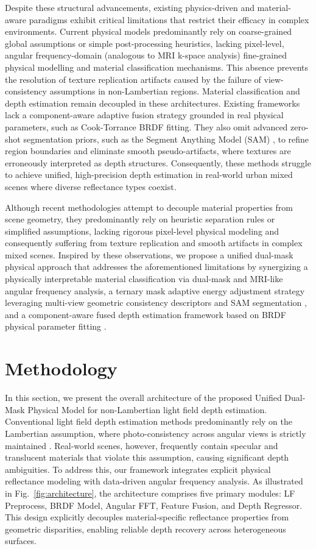 \documentclass[lettersize,journal]{IEEEtran}
\begin{document}
Despite these structural advancements, existing physics-driven and material-aware paradigms exhibit critical limitations that restrict their efficacy in complex environments. Current physical models predominantly rely on coarse-grained global assumptions or simple post-processing heuristics, lacking pixel-level, angular frequency-domain (analogous to MRI k-space analysis) fine-grained physical modelling and material classification mechanisms. This absence prevents the resolution of texture replication artifacts caused by the failure of view-consistency assumptions in non-Lambertian regions. Material classification and depth estimation remain decoupled in these architectures. Existing frameworks lack a component-aware adaptive fusion strategy grounded in real physical parameters, such as Cook-Torrance BRDF fitting. They also omit advanced zero-shot segmentation priors, such as the Segment Anything Model (SAM) \cite{kirillov2023}, to refine region boundaries and eliminate smooth pseudo-artifacts, where textures are erroneously interpreted as depth structures. Consequently, these methods struggle to achieve unified, high-precision depth estimation in real-world urban mixed scenes where diverse reflectance types coexist.

Although recent methodologies \cite{li2021, zhang2023} attempt to decouple material properties from scene geometry, they predominantly rely on heuristic separation rules or simplified assumptions, lacking rigorous pixel-level physical modeling and consequently suffering from texture replication and smooth artifacts in complex mixed scenes. Inspired by these observations, we propose a unified dual-mask physical approach that addresses the aforementioned limitations by synergizing a physically interpretable material classification via dual-mask and MRI-like angular frequency analysis, a ternary mask adaptive energy adjustment strategy leveraging multi-view geometric consistency descriptors and SAM segmentation \cite{kirillov2023}, and a component-aware fused depth estimation framework based on BRDF physical parameter fitting \cite{blinn1977}.

\section{Methodology}

In this section, we present the overall architecture of the proposed Unified Dual-Mask Physical Model for non-Lambertian light field depth estimation. Conventional light field depth estimation methods predominantly rely on the Lambertian assumption, where photo-consistency across angular views is strictly maintained \cite{wanner2014, ng2005}. Real-world scenes, however, frequently contain specular and translucent materials that violate this assumption, causing significant depth ambiguities. To address this, our framework integrates explicit physical reflectance modeling with data-driven angular frequency analysis. As illustrated in Fig.~\ref{fig:architecture}, the architecture comprises five primary modules: LF Preprocess, BRDF Model, Angular FFT, Feature Fusion, and Depth Regressor. This design explicitly decouples material-specific reflectance properties from geometric disparities, enabling reliable depth recovery across heterogeneous surfaces.
\end{document}

